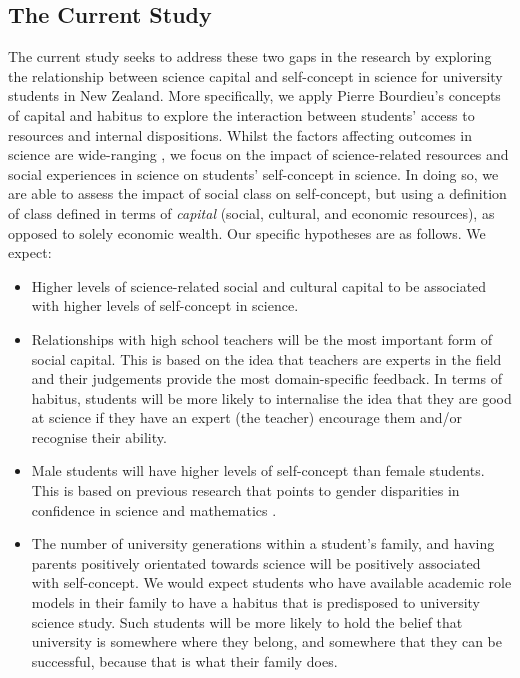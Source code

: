 \subsection*{The Current Study}
\label{sec:3}

The current study seeks to address these two gaps in the research by exploring the relationship between science capital and self-concept in science for university students in New Zealand. More specifically, we apply Pierre Bourdieu's \citep{Bourdieu_1986,Bourdieu1984} concepts of capital and habitus to explore the interaction between students' access to resources and internal dispositions. Whilst the factors affecting outcomes in science are wide-ranging 
\citep{osborne2003attitudes}, we focus on the impact of science-related resources and social experiences in science on students' self-concept in science. In doing so, we are able to assess the impact of social class on self-concept, but using a definition of class defined in terms of \textit{capital} (social, cultural, and economic resources), as opposed to solely economic wealth. Our specific hypotheses are as follows. We expect:
\begin{itemize}
    \item Higher levels of science-related social and cultural capital to be associated with higher levels of self-concept in science. 
    \item Relationships with high school teachers will be the most important form of social capital. This is based on the idea that teachers are experts in the field and their judgements provide the most domain-specific feedback. In terms of habitus, students will be more likely to internalise the idea that they are good at science if they have an expert (the teacher) encourage them and/or recognise their ability. 
    \item Male students will have higher levels of self-concept than female students. This is based on previous research that points to gender disparities in confidence in science and mathematics \citep{Else-Quest2013,Ellis_2016}. 
    \item The number of university generations within a student's family, and having parents positively orientated towards science will be positively associated with self-concept. We would expect students who have available academic role models in their family to have a habitus that is predisposed to university science study. Such students will be more likely to  hold the belief that university is somewhere where they belong, and somewhere that they can be successful, because that is what their family does. 
\end{itemize}
